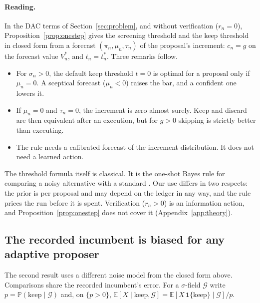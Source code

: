 \paragraph{Reading.}
In the DAC terms of Section~\ref{sec:problem}, and without verification ($r_n=0$), Proposition~\ref{prop:onestep} gives the screening threshold and the keep threshold in closed form from a forecast $(\pi_n,\mu_n,\tau_n)$ of the proposal's increment: $c_n=g$ on the forecast value $V^*_n$, and $t_n=t^*_n$. Three remarks follow.
\begin{itemize}
\item For $\sigma_n>0$, the default keep threshold $t=0$ is optimal for a proposal only if $\mu_n=0$. A sceptical forecast ($\mu_n<0$) raises the bar, and a confident one lowers it.
\item If $\mu_n=0$ and $\tau_n=0$, the increment is zero almost surely. Keep and discard are then equivalent after an execution, but for $g>0$ skipping is strictly better than executing.
\item The rule needs a calibrated forecast of the increment distribution. It does not need a learned action.
\end{itemize}
The threshold formula itself is classical. It is the one-shot Bayes rule for comparing a noisy alternative with a standard \citep{xie2013sequential,chick2012sequential}. Our use differs in two respects: the prior is per proposal and may depend on the ledger in any way, and the rule prices the run before it is spent. Verification ($r_n>0$) is an information action, and Proposition~\ref{prop:onestep} does not cover it (Appendix~\ref{app:theory}).

\subsection{The recorded incumbent is biased for any adaptive proposer}
\label{sec:theory-bias}

The second result uses a different noise model from the closed form above. Comparisons share the recorded incumbent's error. For a $\sigma$-field $\mathcal{G}$ write $p=\mathbb{P}(\mathrm{keep}\mid\mathcal{G})$ and, on $\{p>0\}$, $\mathbb{E}[X\mid\mathrm{keep},\mathcal{G}]=\mathbb{E}[X\,\mathbf{1}\{\mathrm{keep}\}\mid\mathcal{G}]/p$.

